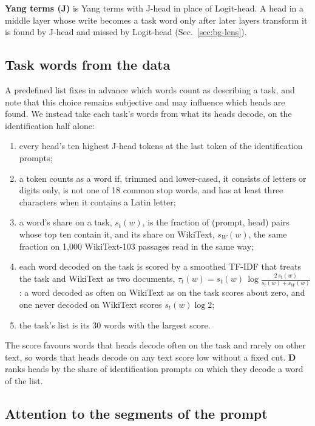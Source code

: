 \documentclass[10pt,a4paper]{article}
\begin{document}
\textbf{Yang terms (J)} is Yang terms with J-head in place of Logit-head. A head in a middle layer whose write becomes a task word only after later layers transform it is found by J-head and missed by Logit-head (Sec.~\ref{sec:bg-lens}).

\subsection{Task words from the data}\label{sec:lists}

A predefined list fixes in advance which words count as describing a task, and \citet[Sec.~4]{yang2026shared} note that this choice remains subjective and may influence which heads are found. We instead take each task's words from what its heads decode, on the identification half alone:
\begin{enumerate}
\item every head's ten highest J-head tokens at the last token of the identification prompts;
\item a token counts as a word if, trimmed and lower-cased, it consists of letters or digits only, is not one of 18 common stop words, and has at least three characters when it contains a Latin letter;
\item a word's share on a task, $s_t(w)$, is the fraction of (prompt, head) pairs whose top ten contain it, and its share on WikiText, $s_W(w)$, the same fraction on 1{,}000 WikiText-103 passages read in the same way;
\item each word decoded on the task is scored by a smoothed TF-IDF that treats the task and WikiText as two documents, $\tau_t(w) = s_t(w)\,\log\frac{2\,s_t(w)}{s_t(w)+s_W(w)}$: a word decoded as often on WikiText as on the task scores about zero, and one never decoded on WikiText scores $s_t(w)\log 2$;
\item the task's list is its 30 words with the largest score.
\end{enumerate}
The score favours words that heads decode often on the task and rarely on other text, so words that heads decode on any text score low without a fixed cut. \textbf{D} ranks heads by the share of identification prompts on which they decode a word of the list.

\subsection{Attention to the segments of the prompt}\label{sec:segments}
\end{document}

